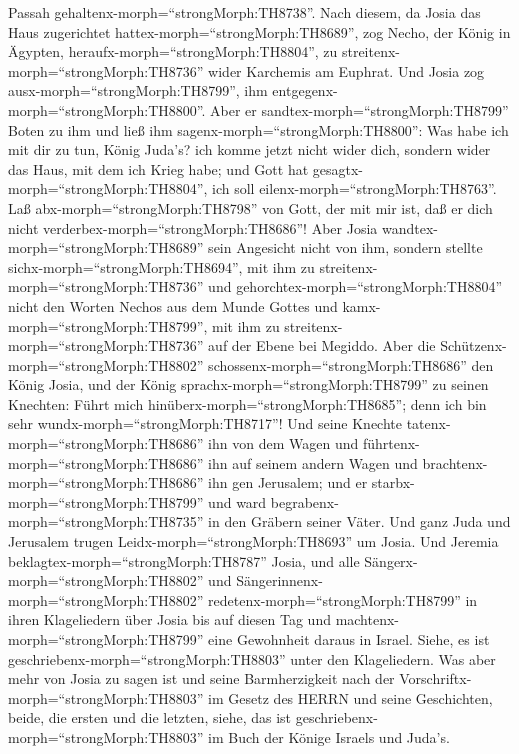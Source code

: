 Passah gehaltenx-morph=``strongMorph:TH8738''.  Nach
diesem, da Josia das Haus zugerichtet
hattex-morph=``strongMorph:TH8689'', zog Necho, der König in Ägypten,
heraufx-morph=``strongMorph:TH8804'', zu
streitenx-morph=``strongMorph:TH8736'' wider Karchemis am Euphrat. Und
Josia zog ausx-morph=``strongMorph:TH8799'', ihm
entgegenx-morph=``strongMorph:TH8800''.  Aber er
sandtex-morph=``strongMorph:TH8799'' Boten zu ihm und ließ ihm
sagenx-morph=``strongMorph:TH8800'': Was habe ich mit dir zu tun, König
Juda's? ich komme jetzt nicht wider dich, sondern wider das Haus, mit
dem ich Krieg habe; und Gott hat gesagtx-morph=``strongMorph:TH8804'',
ich soll eilenx-morph=``strongMorph:TH8763''. Laß
abx-morph=``strongMorph:TH8798'' von Gott, der mit mir ist, daß er dich
nicht verderbex-morph=``strongMorph:TH8686''!  Aber Josia
wandtex-morph=``strongMorph:TH8689'' sein Angesicht nicht von ihm,
sondern stellte sichx-morph=``strongMorph:TH8694'', mit ihm zu
streitenx-morph=``strongMorph:TH8736'' und
gehorchtex-morph=``strongMorph:TH8804'' nicht den Worten Nechos aus dem
Munde Gottes und kamx-morph=``strongMorph:TH8799'', mit ihm zu
streitenx-morph=``strongMorph:TH8736'' auf der Ebene bei Megiddo.
 Aber die Schützenx-morph=``strongMorph:TH8802''
schossenx-morph=``strongMorph:TH8686'' den König Josia, und der König
sprachx-morph=``strongMorph:TH8799'' zu seinen Knechten: Führt mich
hinüberx-morph=``strongMorph:TH8685''; denn ich bin sehr
wundx-morph=``strongMorph:TH8717''!  Und seine Knechte
tatenx-morph=``strongMorph:TH8686'' ihn von dem Wagen und
führtenx-morph=``strongMorph:TH8686'' ihn auf seinem andern Wagen und
brachtenx-morph=``strongMorph:TH8686'' ihn gen Jerusalem; und er
starbx-morph=``strongMorph:TH8799'' und ward
begrabenx-morph=``strongMorph:TH8735'' in den Gräbern seiner Väter. Und
ganz Juda und Jerusalem trugen Leidx-morph=``strongMorph:TH8693'' um
Josia.  Und Jeremia beklagtex-morph=``strongMorph:TH8787''
Josia, und alle Sängerx-morph=``strongMorph:TH8802'' und
Sängerinnenx-morph=``strongMorph:TH8802''
redetenx-morph=``strongMorph:TH8799'' in ihren Klageliedern über Josia
bis auf diesen Tag und machtenx-morph=``strongMorph:TH8799'' eine
Gewohnheit daraus in Israel. Siehe, es ist
geschriebenx-morph=``strongMorph:TH8803'' unter den Klageliedern.
 Was aber mehr von Josia zu sagen ist und seine
Barmherzigkeit nach der Vorschriftx-morph=``strongMorph:TH8803'' im
Gesetz des HERRN  und seine Geschichten, beide, die ersten
und die letzten, siehe, das ist
geschriebenx-morph=``strongMorph:TH8803'' im Buch der Könige Israels und
Juda's.

